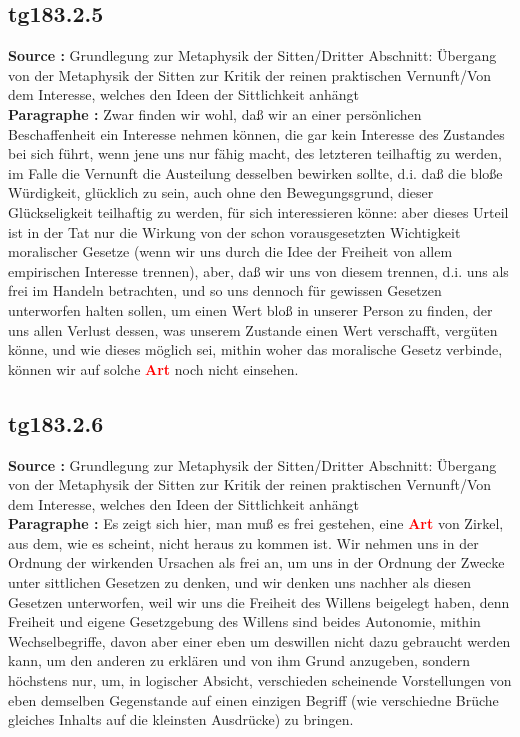 \documentclass[a4paper,12pt,twoside]{book}
\newcommand{\match}[1]{\textcolor{red}{\textbf{#1}}}
\begin{document}
	\subsection*{tg183.2.5} 
	\textbf{Source : }Grundlegung zur Metaphysik der Sitten/Dritter Abschnitt: Übergang von der Metaphysik der Sitten zur Kritik der reinen praktischen Vernunft/Von dem Interesse, welches den Ideen der Sittlichkeit anhängt\\  
	
	\noindent\textbf{Paragraphe : }Zwar finden wir wohl, daß wir an einer persönlichen Beschaffenheit ein Interesse nehmen können, die gar kein Interesse des Zustandes bei sich führt, wenn jene uns nur fähig macht, des letzteren teilhaftig zu werden, im Falle die Vernunft die Austeilung desselben bewirken sollte, d.i. daß die bloße Würdigkeit, glücklich zu sein, auch ohne den Bewegungsgrund, dieser Glückseligkeit teilhaftig zu werden, für sich interessieren könne: aber dieses Urteil ist in der Tat nur die Wirkung von der schon vorausgesetzten Wichtigkeit moralischer Gesetze (wenn wir uns durch die Idee der Freiheit von allem empirischen Interesse trennen), aber, daß wir uns von diesem trennen, d.i. uns als frei im Handeln betrachten, und so uns dennoch für gewissen Gesetzen unterworfen halten sollen, um einen Wert bloß in unserer Person zu finden, der uns allen Verlust dessen, was unserem Zustande einen Wert verschafft, vergüten könne, und wie dieses möglich sei, mithin woher das moralische Gesetz verbinde, können wir auf solche \match{Art} noch nicht einsehen. 
	
	\subsection*{tg183.2.6} 
	\textbf{Source : }Grundlegung zur Metaphysik der Sitten/Dritter Abschnitt: Übergang von der Metaphysik der Sitten zur Kritik der reinen praktischen Vernunft/Von dem Interesse, welches den Ideen der Sittlichkeit anhängt\\  
	
	\noindent\textbf{Paragraphe : }Es zeigt sich hier, man muß es frei gestehen, eine \match{Art} von Zirkel, aus dem, wie es scheint, nicht heraus zu kommen ist. Wir nehmen uns in der Ordnung der wirkenden Ursachen  als frei an, um uns in der Ordnung der Zwecke unter sittlichen Gesetzen zu denken, und wir denken uns nachher als diesen Gesetzen unterworfen, weil wir uns die Freiheit des Willens beigelegt haben, denn Freiheit und eigene Gesetzgebung des Willens sind beides Autonomie, mithin Wechselbegriffe, davon aber einer eben um deswillen nicht dazu gebraucht werden kann, um den anderen zu erklären und von ihm Grund anzugeben, sondern höchstens nur, um, in logischer Absicht, verschieden scheinende Vorstellungen von eben demselben Gegenstande auf einen einzigen Begriff (wie verschiedne Brüche gleiches Inhalts auf die kleinsten Ausdrücke) zu bringen. 
	
\end{document}
